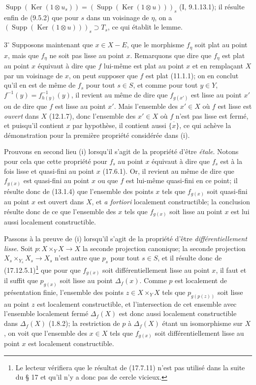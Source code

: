 
$\operatorname{Supp}(\operatorname{Ker}(1\otimes u_s))=(\operatorname{Supp}(\operatorname{Ker}(1\otimes u)))_s$ (I, 9.1.13.1); il résulte enfin de (9.5.2) que pour $s$ dans un voisinage de $\eta$, on a $(\operatorname{Supp}(\operatorname{Ker}(1\otimes u)))_s\supset T_s$, ce qui établit le lemme.

$3^\circ$ Supposons maintenant que $x\in X-E$, que le morphisme $f_\eta$ soit plat au point $x$, mais que $f_\eta$ ne soit pas lisse au point $x$. Remarquons que dire que $f_\eta$ est plat au point $x$ équivaut à dire que $f$ lui-même est plat au point $x$ et en remplaçant $X$ par un voisinage de $x$, on peut supposer que $f$ est plat (11.1.1); on en conclut qu'il en est de même de $f_s$ pour tout $s\in S$, et comme pour tout $y\in Y$, $f^{-1}(y)=f_{h(y)}^{-1}(y)$, il revient au même de dire que $f_{g(x')}$ est lisse au point $x'$ ou de dire que $f$ est lisse au point $x'$. Mais l'ensemble des $x'\in X$ où $f$ est lisse est \emph{ouvert} dans $X$ (12.1.7), donc l'ensemble des $x'\in X$ où $f$ n'est pas lisse est fermé, et puisqu'il contient $x$ par hypothèse, il contient aussi $\overline{\{x\}}$, ce qui achève la démonstration pour la première propriété considérée dans (i).

Prouvons en second lieu (i) lorsqu'il s'agit de la propriété d'être \emph{étale}. Notons pour cela que cette propriété pour $f_s$ au point $x$ équivaut à dire que $f_s$ est à la fois lisse et quasi-fini au point $x$ (17.6.1). Or, il revient au même de dire que $f_{g(x)}$ est quasi-fini au point $x$ ou que $f$ est lui-même quasi-fini en ce point; il résulte donc de (13.1.4) que l'ensemble des points $x$ tels que $f_{g(x)}$ soit quasi-fini au point $x$ est ouvert dans $X$, et \emph{a fortiori} localement constructible; la conclusion résulte donc de ce que l'ensemble des $x$ tels que $f_{g(x)}$ soit lisse au point $x$ est lui aussi localement constructible.

Passons à la preuve de (i) lorsqu'il s'agit de la propriété d'être \emph{différentiellement lisse}. Soit $p:X\times_Y X\to X$ la seconde projection canonique; la seconde projection $X_s\times_{Y_s}X_s\to X_s$ n'est autre que $p_s$ pour tout $s\in S$, et il résulte donc de (17.12.5.1)\footnote{Le lecteur vérifiera que le résultat de (17.7.11) n'est pas utilisé dans la suite du § 17 et qu'il n'y a donc pas de cercle vicieux.} que pour que $f_{g(x)}$ soit différentiellement lisse au point $x$, il faut et il suffit que $p_{g(x)}$ soit lisse au point $\Delta_f(x)$. Comme $p$ est localement de présentation finie, l'ensemble des points $z\in X\times_Y X$ tels que $p_{g(p(z))}$ soit lisse au point $z$ est localement constructible, et l'intersection de cet ensemble avec l'ensemble localement fermé $\Delta_f(X)$ est donc aussi localement constructible dans $\Delta_f(X)$ (1.8.2); la restriction de $p$ à $\Delta_f(X)$ étant un isomorphisme sur $X$, on voit que l'ensemble des $x\in X$ tels que $f_{g(x)}$ soit différentiellement lisse au point $x$ est localement constructible.


